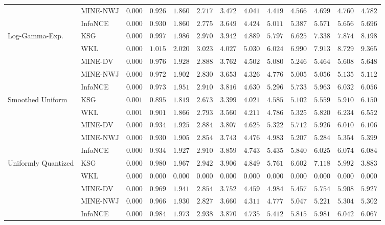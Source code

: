 \begin{tabular}{llccccccccccc}
 & MINE-NWJ & $ 0.000 $ & $ 0.926 $ & $ 1.860 $ & $ 2.717 $ & $ 3.472 $ & $ 4.041 $ & $ 4.419 $ & $ 4.566 $ & $ 4.699 $ & $ 4.760 $ & $ 4.782 $ \\
 & InfoNCE & $ 0.000 $ & $ 0.930 $ & $ 1.860 $ & $ 2.775 $ & $ 3.649 $ & $ 4.424 $ & $ 5.011 $ & $ 5.387 $ & $ 5.571 $ & $ 5.656 $ & $ 5.696 $ \\
\cmidrule{1-13}
\multirow[l]{5}{*}{Log-Gamma-Exp.} & KSG & $ 0.000 $ & $ 0.997 $ & $ 1.986 $ & $ 2.970 $ & $ 3.942 $ & $ 4.889 $ & $ 5.797 $ & $ 6.625 $ & $ 7.338 $ & $ 7.874 $ & $ 8.198 $ \\
 & WKL & $ 0.000 $ & $ 1.015 $ & $ 2.020 $ & $ 3.023 $ & $ 4.027 $ & $ 5.030 $ & $ 6.024 $ & $ 6.990 $ & $ 7.913 $ & $ 8.729 $ & $ 9.365 $ \\
 & MINE-DV & $ 0.000 $ & $ 0.976 $ & $ 1.928 $ & $ 2.888 $ & $ 3.762 $ & $ 4.502 $ & $ 5.080 $ & $ 5.246 $ & $ 5.464 $ & $ 5.608 $ & $ 5.648 $ \\
 & MINE-NWJ & $ 0.000 $ & $ 0.972 $ & $ 1.902 $ & $ 2.830 $ & $ 3.653 $ & $ 4.326 $ & $ 4.776 $ & $ 5.005 $ & $ 5.056 $ & $ 5.135 $ & $ 5.112 $ \\
 & InfoNCE & $ 0.000 $ & $ 0.973 $ & $ 1.951 $ & $ 2.910 $ & $ 3.816 $ & $ 4.630 $ & $ 5.296 $ & $ 5.733 $ & $ 5.963 $ & $ 6.032 $ & $ 6.056 $ \\
\cmidrule{1-13}
\multirow[l]{5}{*}{Smoothed Uniform} & KSG & $ 0.001 $ & $ 0.895 $ & $ 1.819 $ & $ 2.673 $ & $ 3.399 $ & $ 4.021 $ & $ 4.585 $ & $ 5.102 $ & $ 5.559 $ & $ 5.910 $ & $ 6.150 $ \\
 & WKL & $ 0.001 $ & $ 0.901 $ & $ 1.866 $ & $ 2.793 $ & $ 3.560 $ & $ 4.211 $ & $ 4.786 $ & $ 5.325 $ & $ 5.820 $ & $ 6.234 $ & $ 6.552 $ \\
 & MINE-DV & $ 0.000 $ & $ 0.934 $ & $ 1.925 $ & $ 2.884 $ & $ 3.807 $ & $ 4.625 $ & $ 5.322 $ & $ 5.712 $ & $ 5.926 $ & $ 6.010 $ & $ 6.106 $ \\
 & MINE-NWJ & $ 0.000 $ & $ 0.930 $ & $ 1.905 $ & $ 2.854 $ & $ 3.743 $ & $ 4.476 $ & $ 4.983 $ & $ 5.207 $ & $ 5.284 $ & $ 5.354 $ & $ 5.399 $ \\
 & InfoNCE & $ 0.000 $ & $ 0.934 $ & $ 1.927 $ & $ 2.910 $ & $ 3.859 $ & $ 4.743 $ & $ 5.435 $ & $ 5.840 $ & $ 6.025 $ & $ 6.074 $ & $ 6.084 $ \\
\cmidrule{1-13}
\multirow[l]{5}{*}{Uniformly Quantized} & KSG & $ 0.000 $ & $ 0.980 $ & $ 1.967 $ & $ 2.942 $ & $ 3.906 $ & $ 4.849 $ & $ 5.761 $ & $ 6.602 $ & $ 7.118 $ & $ 5.992 $ & $ 3.883 $ \\
 & WKL & $ 0.000 $ & $ 0.000 $ & $ 0.000 $ & $ 0.000 $ & $ 0.000 $ & $ 0.000 $ & $ 0.000 $ & $ 0.000 $ & $ 0.000 $ & $ 0.000 $ & $ 0.000 $ \\
 & MINE-DV & $ 0.000 $ & $ 0.969 $ & $ 1.941 $ & $ 2.854 $ & $ 3.752 $ & $ 4.459 $ & $ 4.984 $ & $ 5.457 $ & $ 5.754 $ & $ 5.908 $ & $ 5.927 $ \\
 & MINE-NWJ & $ 0.000 $ & $ 0.966 $ & $ 1.930 $ & $ 2.827 $ & $ 3.660 $ & $ 4.311 $ & $ 4.777 $ & $ 5.047 $ & $ 5.221 $ & $ 5.304 $ & $ 5.302 $ \\
 & InfoNCE & $ 0.000 $ & $ 0.984 $ & $ 1.973 $ & $ 2.938 $ & $ 3.870 $ & $ 4.735 $ & $ 5.412 $ & $ 5.815 $ & $ 5.981 $ & $ 6.042 $ & $ 6.067 $ \\
\bottomrule
\end{tabular}
